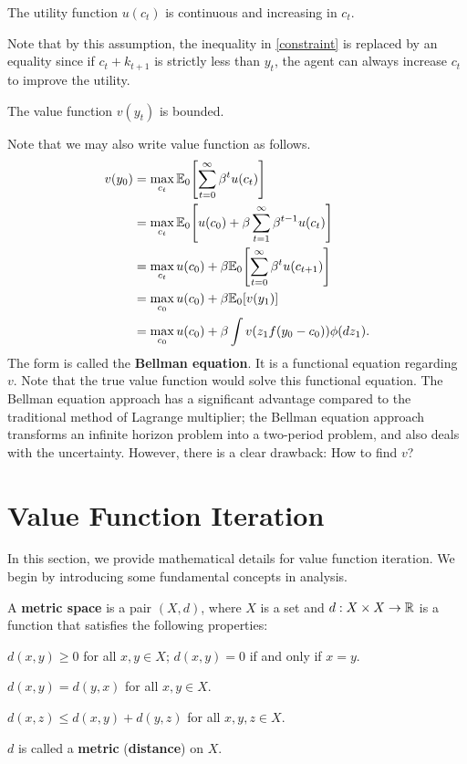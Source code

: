 \documentclass[12pt]{article}
\begin{document}
\begin{assumption}
    The utility function $u(c_t)$ is continuous and increasing in 
    $c_t$.
\end{assumption}

Note that by this assumption, the inequality in \eqref{constraint} 
is replaced by an equality since if $c_t + k_{t+1}$ is strictly less 
than $y_t$, the agent can always increase $c_t$ to improve the 
utility. 

\begin{assumption}
    The value function $v(y_t)$ is bounded.
\end{assumption}

Note that we may also write value function as follows. 
\begin{equation}
    \begin{split}
        v(y_0) 
        &= \max_{c_t} \E_0\sbrc{\sum_{t=0}^{\infty} \beta^t u(c_t)}\\
        &= \max_{c_t} \E_0\sbrc{u(c_0) + \beta\sum_{t=1}^{\infty} \beta^{t-1} u(c_t)}\\
        &= \max_{c_t} u(c_0) + \beta\E_0\sbrc{\sum_{t=0}^{\infty} \beta^{t} u(c_{t+1})}\\ 
        &= \max_{c_0} u(c_0) + \beta\E_0\sbrc{v(y_1)}\\
        &= \max_{c_0} u(c_0) + \beta\int v(z_1f(y_0-c_0))\phi(dz_1).
    \end{split}
\end{equation}
The form is called the \textbf{Bellman equation}. It is a functional 
equation regarding $v$. Note that the true value function would solve 
this functional equation. The Bellman equation approach 
has a significant advantage compared to the traditional method of 
Lagrange multiplier; the Bellman equation approach transforms an 
infinite horizon problem into a two-period problem, and also deals 
with the uncertainty. However, there is a clear drawback: How to find 
$v$? 

\section{Value Function Iteration} 
In this section, we provide mathematical details for value function 
iteration. We begin by introducing some 
fundamental concepts in analysis. 

\begin{definition}
    A \textbf{metric space} is a pair $(X, d)$, where $X$ is a set 
    and $d: X \times X \to \mathbb{R}$ is a function that satisfies the 
    following properties: 
    \begin{thmenum}
        \item $d(x, y) \geq 0$ for all $x, y \in X$; $d(x, y) = 0$ 
        if and only if $x = y$.
        \item $d(x, y) = d(y, x)$ for all $x, y \in X$.
        \item $d(x, z) \leq d(x, y) + d(y, z)$ for all $x, y, z \in X$.
    \end{thmenum}
    $d$ is called a \textbf{metric} (\textbf{distance}) on $X$.
\end{definition}
\end{document}
